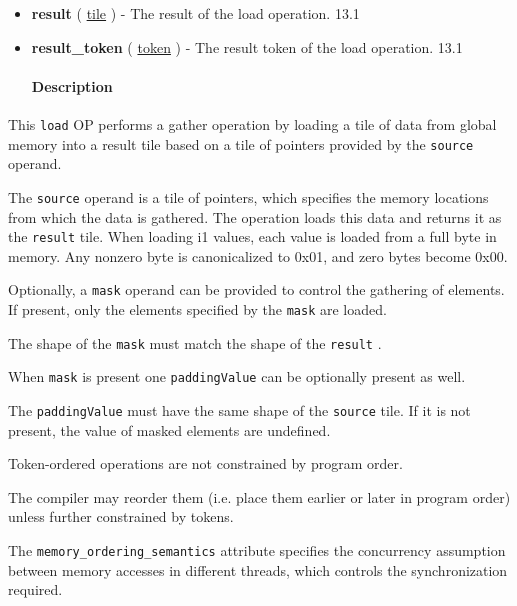 \documentclass{article}
\begin{document}
\begin{itemize}
\paragraph{Results}

\item \textbf{result} ( \href{https://docs.nvidia.com/cuda/tile-ir/latest/sections/types.html#type-tile}{tile} ) - The result of the load operation. 13.1
\item \textbf{result\_token} ( \href{https://docs.nvidia.com/cuda/tile-ir/latest/sections/operations.html#type-token}{token} ) - The result token of the load operation. 13.1


\paragraph{Description}

\end{itemize}
This \texttt{load} OP performs a gather operation by loading a tile of data from global memory into a result tile based on a tile of pointers provided by the \texttt{source} operand.


The \texttt{source} operand is a tile of pointers, which specifies the memory locations from which the data is gathered. The operation loads this data and returns it as the \texttt{result} tile. When loading i1 values, each value is loaded from a full byte in memory. Any nonzero byte is canonicalized to 0x01, and zero bytes become 0x00.


Optionally, a \texttt{mask} operand can be provided to control the gathering of elements. If present, only the elements specified by the \texttt{mask} are loaded.

The shape of the \texttt{mask} must match the shape of the \texttt{result} .


When \texttt{mask} is present one \texttt{paddingValue} can be optionally present as well.

The \texttt{paddingValue} must have the same shape of the \texttt{source} tile. If it is not present, the value of masked elements are undefined.


Token-ordered operations are not constrained by program order.

The compiler may reorder them (i.e. place them earlier or later in program order) unless further constrained by tokens.


The \texttt{memory\_ordering\_semantics} attribute specifies the concurrency assumption between memory accesses in different threads, which controls the synchronization required.
\end{document}
